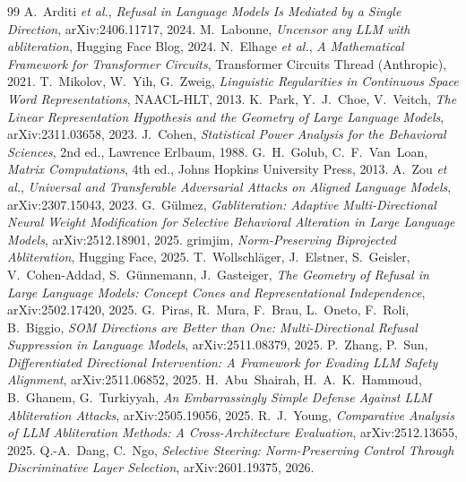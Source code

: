 \documentclass[11pt,a4paper]{article}
\theoremstyle{definition}
\theoremstyle{plain}
\begin{document}
\begin{thebibliography}{99}
 A.~Arditi \emph{et al.}, \emph{Refusal in Language Models Is
Mediated by a Single Direction}, arXiv:2406.11717, 2024.
 M.~Labonne, \emph{Uncensor any LLM with abliteration},
Hugging Face Blog, 2024.
 N.~Elhage \emph{et al.}, \emph{A Mathematical Framework for
Transformer Circuits}, Transformer Circuits Thread (Anthropic), 2021.
 T.~Mikolov, W.~Yih, G.~Zweig, \emph{Linguistic Regularities
in Continuous Space Word Representations}, NAACL-HLT, 2013.
 K.~Park, Y.~J.~Choe, V.~Veitch, \emph{The Linear Representation
Hypothesis and the Geometry of Large Language Models}, arXiv:2311.03658, 2023.
 J.~Cohen, \emph{Statistical Power Analysis for the Behavioral
Sciences}, 2nd ed., Lawrence Erlbaum, 1988.
 G.~H.~Golub, C.~F.~Van~Loan, \emph{Matrix Computations},
4th ed., Johns Hopkins University Press, 2013.
 A.~Zou \emph{et al.}, \emph{Universal and Transferable Adversarial
Attacks on Aligned Language Models}, arXiv:2307.15043, 2023.
 G.~Gülmez, \emph{Gabliteration: Adaptive Multi-Directional
Neural Weight Modification for Selective Behavioral Alteration in Large Language
Models}, arXiv:2512.18901, 2025.
 grimjim, \emph{Norm-Preserving Biprojected Abliteration},
Hugging Face, 2025.
 T.~Wollschläger, J.~Elstner, S.~Geisler, V.~Cohen-Addad,
S.~Günnemann, J.~Gasteiger, \emph{The Geometry of Refusal in Large Language Models:
Concept Cones and Representational Independence}, arXiv:2502.17420, 2025.
 G.~Piras, R.~Mura, F.~Brau, L.~Oneto, F.~Roli, B.~Biggio,
\emph{SOM Directions are Better than One: Multi-Directional Refusal Suppression in
Language Models}, arXiv:2511.08379, 2025.
 P.~Zhang, P.~Sun, \emph{Differentiated Directional
Intervention: A Framework for Evading LLM Safety Alignment}, arXiv:2511.06852, 2025.
 H.~Abu~Shairah, H.~A.~K.~Hammoud, B.~Ghanem, G.~Turkiyyah,
\emph{An Embarrassingly Simple Defense Against LLM Abliteration Attacks},
arXiv:2505.19056, 2025.
 R.~J.~Young, \emph{Comparative Analysis of LLM Abliteration
Methods: A Cross-Architecture Evaluation}, arXiv:2512.13655, 2025.
 Q.-A.~Dang, C.~Ngo, \emph{Selective Steering: Norm-Preserving
Control Through Discriminative Layer Selection}, arXiv:2601.19375, 2026.
\end{thebibliography}
\end{document}

